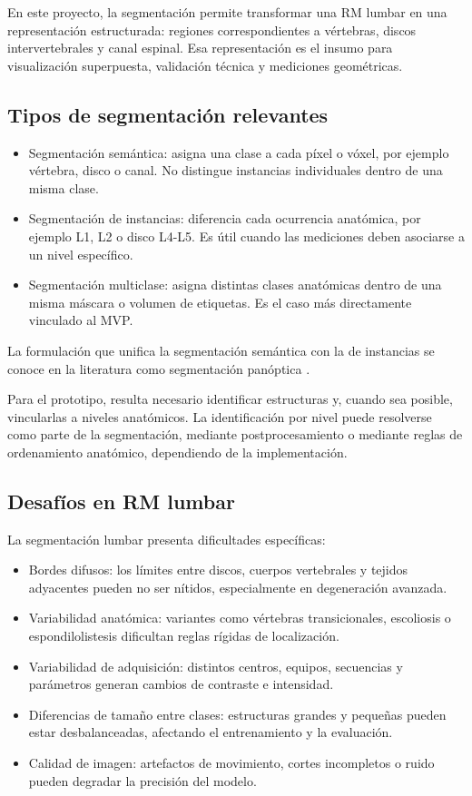 En este proyecto, la segmentación permite transformar una RM lumbar en una representación estructurada: regiones correspondientes a vértebras, discos intervertebrales y canal espinal. Esa representación es el insumo para visualización superpuesta, validación técnica y mediciones geométricas.

\subsection{Tipos de segmentación relevantes}

\begin{itemize}
  \item Segmentación semántica: asigna una clase a cada píxel o vóxel, por ejemplo vértebra, disco o canal. No distingue instancias individuales dentro de una misma clase.
  \item Segmentación de instancias: diferencia cada ocurrencia anatómica, por ejemplo L1, L2 o disco L4-L5. Es útil cuando las mediciones deben asociarse a un nivel específico.
  \item Segmentación multiclase: asigna distintas clases anatómicas dentro de una misma máscara o volumen de etiquetas. Es el caso más directamente vinculado al MVP.
\end{itemize}

La formulación que unifica la segmentación semántica con la de instancias se conoce en la literatura como segmentación panóptica \parencite{kirillov_panoptic_2019}.

Para el prototipo, resulta necesario identificar estructuras y, cuando sea posible, vincularlas a niveles anatómicos. La identificación por nivel puede resolverse como parte de la segmentación, mediante postprocesamiento o mediante reglas de ordenamiento anatómico, dependiendo de la implementación.

\subsection{Desafíos en RM lumbar}

La segmentación lumbar presenta dificultades específicas:

\begin{itemize}
  \item Bordes difusos: los límites entre discos, cuerpos vertebrales y tejidos adyacentes pueden no ser nítidos, especialmente en degeneración avanzada.
  \item Variabilidad anatómica: variantes como vértebras transicionales, escoliosis o espondilolistesis dificultan reglas rígidas de localización.
  \item Variabilidad de adquisición: distintos centros, equipos, secuencias y parámetros generan cambios de contraste e intensidad.
  \item Diferencias de tamaño entre clases: estructuras grandes y pequeñas pueden estar desbalanceadas, afectando el entrenamiento y la evaluación.
  \item Calidad de imagen: artefactos de movimiento, cortes incompletos o ruido pueden degradar la precisión del modelo.
\end{itemize}

